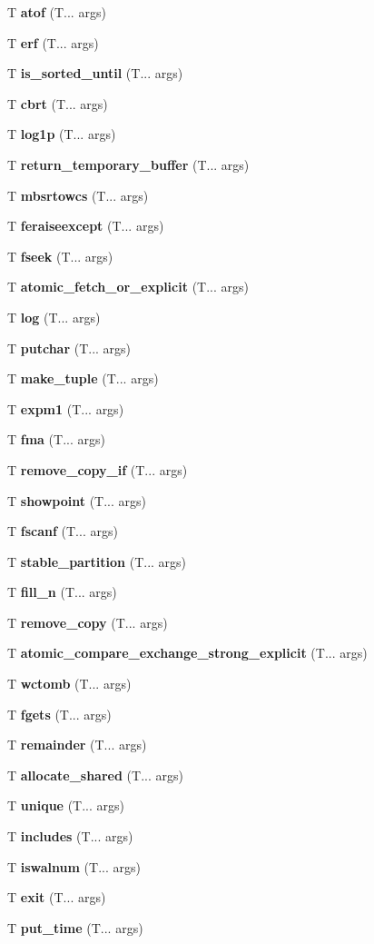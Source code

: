 \begin{DoxyCompactItemize}
T \textbf{ atof} (T... args)
\item 
T \textbf{ erf} (T... args)
\item 
T \textbf{ is\+\_\+sorted\+\_\+until} (T... args)
\item 
T \textbf{ cbrt} (T... args)
\item 
T \textbf{ log1p} (T... args)
\item 
T \textbf{ return\+\_\+temporary\+\_\+buffer} (T... args)
\item 
T \textbf{ mbsrtowcs} (T... args)
\item 
T \textbf{ feraiseexcept} (T... args)
\item 
T \textbf{ fseek} (T... args)
\item 
T \textbf{ atomic\+\_\+fetch\+\_\+or\+\_\+explicit} (T... args)
\item 
T \textbf{ log} (T... args)
\item 
T \textbf{ putchar} (T... args)
\item 
T \textbf{ make\+\_\+tuple} (T... args)
\item 
T \textbf{ expm1} (T... args)
\item 
T \textbf{ fma} (T... args)
\item 
T \textbf{ remove\+\_\+copy\+\_\+if} (T... args)
\item 
T \textbf{ showpoint} (T... args)
\item 
T \textbf{ fscanf} (T... args)
\item 
T \textbf{ stable\+\_\+partition} (T... args)
\item 
T \textbf{ fill\+\_\+n} (T... args)
\item 
T \textbf{ remove\+\_\+copy} (T... args)
\item 
T \textbf{ atomic\+\_\+compare\+\_\+exchange\+\_\+strong\+\_\+explicit} (T... args)
\item 
T \textbf{ wctomb} (T... args)
\item 
T \textbf{ fgets} (T... args)
\item 
T \textbf{ remainder} (T... args)
\item 
T \textbf{ allocate\+\_\+shared} (T... args)
\item 
T \textbf{ unique} (T... args)
\item 
T \textbf{ includes} (T... args)
\item 
T \textbf{ iswalnum} (T... args)
\item 
T \textbf{ exit} (T... args)
\item 
T \textbf{ put\+\_\+time} (T... args)
\item 

\end{DoxyCompactItemize}
